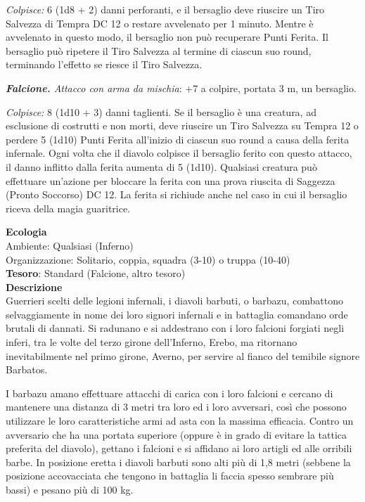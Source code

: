 \begin{multicols}{2}
	\textit{Colpisce:} 6 (1d8 + 2) danni perforanti, e il bersaglio deve riuscire un Tiro Salvezza di Tempra DC 12 o restare avvelenato per 1 minuto. Mentre è avvelenato in questo modo, il bersaglio non può recuperare Punti Ferita. Il bersaglio può ripetere il Tiro Salvezza al termine di ciascun suo round, terminando l'effetto se riesce il Tiro Salvezza.

	\textit{\textbf{Falcione.} Attacco con arma da mischia}: +7 a colpire, portata 3 m, un bersaglio.

	\textit{Colpisce:} 8 (1d10 + 3) danni taglienti. Se il bersaglio è una creatura, ad esclusione di costrutti e non morti, deve riuscire un Tiro Salvezza su Tempra 12 o perdere 5 (1d10) Punti Ferita all'inizio di ciascun suo round a causa della ferita infernale. Ogni volta che il diavolo colpisce il bersaglio ferito con questo attacco, il danno inflitto dalla ferita aumenta di 5 (1d10). Qualsiasi creatura può effettuare un'azione per bloccare la ferita con una prova riuscita di Saggezza (Pronto Soccorso) DC 12. La ferita si richiude anche nel caso in cui il bersaglio riceva della magia guaritrice.

	\textbf{Ecologia}\\
	Ambiente: Qualsiasi (Inferno)\\
	Organizzazione: Solitario, coppia, squadra (3-10) o truppa (10-40)\\
	\textbf{Tesoro}: Standard (Falcione, altro tesoro)\\
	\textbf{Descrizione}\\
	Guerrieri scelti delle legioni infernali, i diavoli barbuti, o barbazu, combattono selvaggiamente in nome dei loro signori infernali e in battaglia comandano orde brutali di dannati. Si radunano e si addestrano con i loro falcioni forgiati negli inferi, tra le volte del terzo girone dell'Inferno, Erebo, ma ritornano inevitabilmente nel primo girone, Averno, per servire al fianco del temibile signore Barbatos.

	I barbazu amano effettuare attacchi di carica con i loro falcioni e cercano di mantenere una distanza di 3 metri tra loro ed i loro avversari, così che possono utilizzare le loro caratteristiche armi ad asta con la massima efficacia. Contro un avversario che ha una portata superiore (oppure è in grado di evitare la tattica preferita del diavolo), gettano i falcioni e si affidano ai loro artigli ed alle orribili barbe. In posizione eretta i diavoli barbuti sono alti più di 1,8 metri (sebbene la posizione accovacciata che tengono in battaglia li faccia spesso sembrare più bassi) e pesano più di 100 kg.



\end{multicols}
